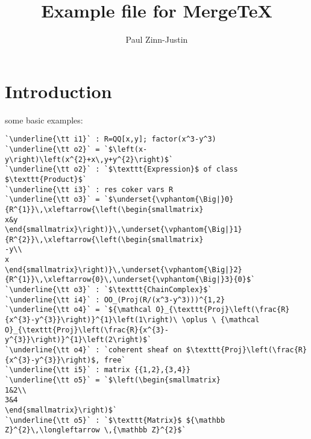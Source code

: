 \documentclass[12pt,a4paper]{amsart}
\title{Example file for MergeTeX}
\author{Paul Zinn-Justin}
\begin{document}
\maketitle

\section{Introduction}
some basic examples:
\begin{lstlisting}[language=Macaulay2output]
`\underline{\tt i1}` : R=QQ[x,y]; factor(x^3-y^3)
`\underline{\tt o2}` = `$\left(x-y\right)\left(x^{2}+x\,y+y^{2}\right)$`
`\underline{\tt o2}` : `$\texttt{Expression}$ of class $\texttt{Product}$`
`\underline{\tt i3}` : res coker vars R
`\underline{\tt o3}` = `$\underset{\vphantom{\Big|}0}{R^{1}}\,\xleftarrow{\left(\begin{smallmatrix}
x&y
\end{smallmatrix}\right)}\,\underset{\vphantom{\Big|}1}{R^{2}}\,\xleftarrow{\left(\begin{smallmatrix}
-y\\
x
\end{smallmatrix}\right)}\,\underset{\vphantom{\Big|}2}{R^{1}}\,\xleftarrow{0}\,\underset{\vphantom{\Big|}3}{0}$`
`\underline{\tt o3}` : `$\texttt{ChainComplex}$`
`\underline{\tt i4}` : OO_(Proj(R/(x^3-y^3)))^{1,2}
`\underline{\tt o4}` = `${\mathcal O}_{\texttt{Proj}\left(\frac{R}{x^{3}-y^{3}}\right)}^{1}\left(1\right)\ \oplus \ {\mathcal O}_{\texttt{Proj}\left(\frac{R}{x^{3}-y^{3}}\right)}^{1}\left(2\right)$`
`\underline{\tt o4}` : `coherent sheaf on $\texttt{Proj}\left(\frac{R}{x^{3}-y^{3}}\right)$, free`
`\underline{\tt i5}` : matrix {{1,2},{3,4}}
`\underline{\tt o5}` = `$\left(\begin{smallmatrix}
1&2\\
3&4
\end{smallmatrix}\right)$`
`\underline{\tt o5}` : `$\texttt{Matrix}$ ${\mathbb Z}^{2}\,\longleftarrow \,{\mathbb Z}^{2}$`
\end{lstlisting}
\end{document}
